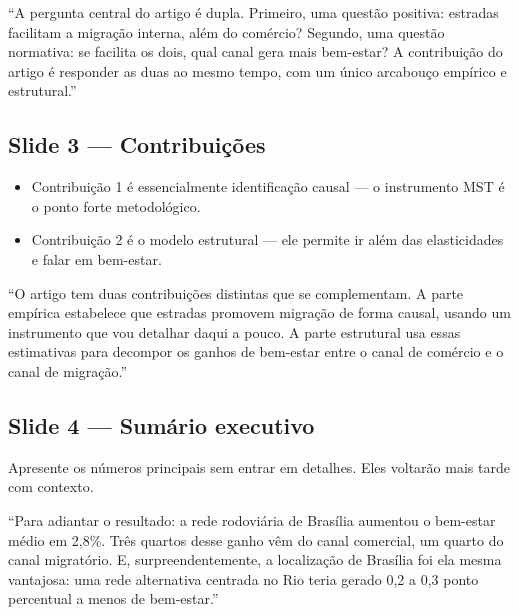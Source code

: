 \documentclass[12pt, a4paper]{article}
\begin{document}
\begin{mdframed}[style=sintese]
``A pergunta central do artigo é dupla. Primeiro, uma questão positiva: estradas facilitam a
migração interna, além do comércio? Segundo, uma questão normativa: se facilita os dois,
qual canal gera mais bem-estar? A contribuição do artigo é responder as duas ao mesmo tempo,
com um único arcabouço empírico e estrutural.''
\end{mdframed}

\subsection*{Slide 3 --- Contribuições}

\begin{itemize}
    \item Contribuição 1 é essencialmente identificação causal --- o instrumento MST é o ponto forte metodológico.
    \item Contribuição 2 é o modelo estrutural --- ele permite ir além das elasticidades e falar em bem-estar.
\end{itemize}

\begin{mdframed}[style=sintese]
``O artigo tem duas contribuições distintas que se complementam. A parte empírica estabelece que estradas
promovem migração de forma causal, usando um instrumento que vou detalhar daqui a pouco. A parte estrutural
usa essas estimativas para decompor os ganhos de bem-estar entre o canal de comércio e o canal de migração.''
\end{mdframed}

\subsection*{Slide 4 --- Sumário executivo}

Apresente os números principais sem entrar em detalhes. Eles voltarão mais tarde com contexto.

\begin{mdframed}[style=sintese]
``Para adiantar o resultado: a rede rodoviária de Brasília aumentou o bem-estar médio em 2,8\%.
Três quartos desse ganho vêm do canal comercial, um quarto do canal migratório. E, surpreendentemente,
a localização de Brasília foi ela mesma vantajosa: uma rede alternativa centrada no Rio teria gerado
0,2 a 0,3 ponto percentual a menos de bem-estar.''
\end{mdframed}

\vspace{0.3cm}
\end{document}
